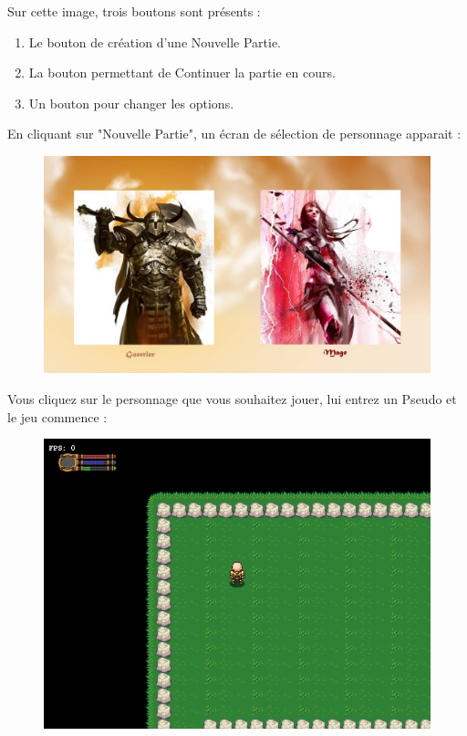 \documentclass[a4paper,titlepage]{article}
\begin{document}
	Sur cette image, trois boutons sont présents : 
	\begin{enumerate}
		\item Le bouton de création d'une Nouvelle Partie.
		\item La bouton permettant de Continuer la partie en cours.
		\item Un bouton pour changer les options.
	\end{enumerate}
	
	En cliquant sur "Nouvelle Partie", un écran de sélection de personnage apparait :
	\begin{figure}[h!]
		\includegraphics[scale=0.30]{EcranCreationPersonnage.jpg}
	\end{figure}
	
	Vous cliquez sur le personnage que vous souhaitez jouer, lui entrez un Pseudo et le jeu commence :
	\begin{figure}[h!]
		\includegraphics[scale=0.65]{carteJeu.png}
	\end{figure}
	
\end{document}
